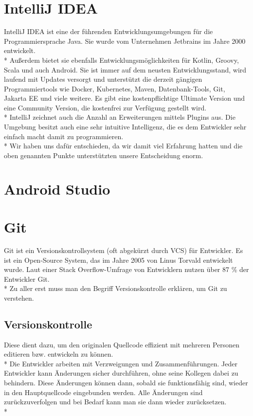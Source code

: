 \section{IntelliJ IDEA}
\author{Benjamin Besic}

IntelliJ IDEA ist eine der führenden Entwicklungsumgebungen für die Programmiersprache Java. Sie wurde vom Unternehmen Jetbrains im Jahre 2000 entwickelt.
\\* Außerdem bietet sie ebenfalls Entwicklungsmöglichkeiten für Kotlin, Groovy, Scala und auch Android.
 Sie ist immer auf dem neusten Entwicklungsstand, wird laufend mit Updates versorgt und unterstützt die derzeit gängigen Programmiertools
wie Docker, Kubernetes, Maven, Datenbank-Tools, Git, Jakarta EE und viele weitere.
Es gibt eine kostenpflichtige Ultimate Version und eine Community Version, die kostenfrei zur Verfügung gestellt wird.
\\* IntelliJ zeichnet auch die Anzahl an Erweiterungen mittels Plugins aus. Die Umgebung besitzt auch eine
sehr intuitive Intelligenz, die es dem Entwickler sehr einfach macht damit zu programmieren.
\cite{IntJ} \\*
Wir haben uns dafür entschieden, da wir damit viel Erfahrung hatten und die oben genannten Punkte
unterstützten unsere Entscheidung enorm.

\section{Android Studio}

\section{Git}
\author{Benjamin Besic}
Git ist ein Versionskontrollsystem (oft abgekürzt durch VCS) für Entwickler. Es ist ein Open-Source System, das im Jahre 2005
von Linus Torvald entwickelt wurde. Laut einer Stack Overflow-Umfrage von Entwicklern nutzen über 87 \% der Entwickler Git.
\cite{GitKinsta}
\\* Zu aller erst muss man den Begriff Versionskontrolle erklären, um Git zu verstehen.
\subsection{Versionskontrolle}
Diese dient dazu, um den originalen Quellcode effizient mit mehreren Personen editieren bzw. entwickeln zu können. 
\\* Die Entwickler arbeiten mit Verzweigungen und Zusammenführungen. Jeder Entwickler kann Änderungen sicher durchführen, ohne seine Kollegen dabei 
zu behindern. Diese Änderungen können dann, sobald sie funktionsfähig sind, wieder in den Hauptquellcode eingebunden werden.
Alle Änderungen sind zurückzuverfolgen und bei Bedarf kann man sie dann wieder zurücksetzen.
\cite{GitKinsta} \\*

